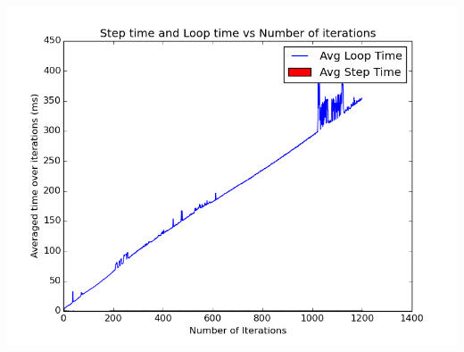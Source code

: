 \documentclass[11pt]{article}
\begin{document}
	\begin{center}
	  \includegraphics[scale=0.5]{images/g26_plot00_1200x150_uneven}
	\end{center}
	
\end{document}
